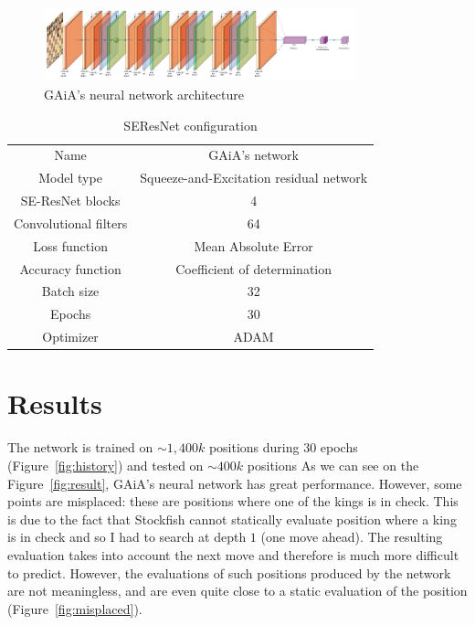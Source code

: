 \documentclass[unnumsec,webpdf,contemporary,large]{Article}%
\theoremstyle{thmstyleone}%
\theoremstyle{thmstyletwo}%
\theoremstyle{thmstylethree}%
\begin{document}
\begin{figure}[H]
  \centering
  \includegraphics[width=9cm]{network/network.pdf}
  \caption{GAiA's neural network architecture}
  \label{fig:model_archi}
\end{figure}

\begin{table}[H]
  \centering
  \begin{tabular}{c c}
    \hline
    Name & GAiA's network\\
    Model type & Squeeze-and-Excitation residual network\\
    \hline
    SE-ResNet blocks & 4\\
    Convolutional filters & 64\\
    Loss function & Mean Absolute Error\\
    Accuracy function & Coefficient of determination\\
    Batch size & 32\\
    Epochs & 30\\
    Optimizer & ADAM\\
    \hline
  \end{tabular}
  \caption{SEResNet configuration}
  \label{table:config}
\end{table}

\section{Results}

The network is trained on $\sim 1,400k$ positions during 30 epochs (Figure~\ref{fig:history})
and tested on $\sim 400k$ positions
As we can see on the Figure~\ref{fig:result}, GAiA's neural network
has great performance.
However, some points are misplaced: these are positions where one of the kings is
in check. This is due to the fact that Stockfish cannot statically evaluate
position where a king is in check and so I had to search at depth $1$ (one move ahead).
The resulting evaluation takes into account the next move and therefore
is much more difficult to predict. However, the evaluations of
such positions produced by the network are not meaningless,
and are even quite close to a static evaluation of the position
(Figure~\ref{fig:misplaced}).
\end{document}

